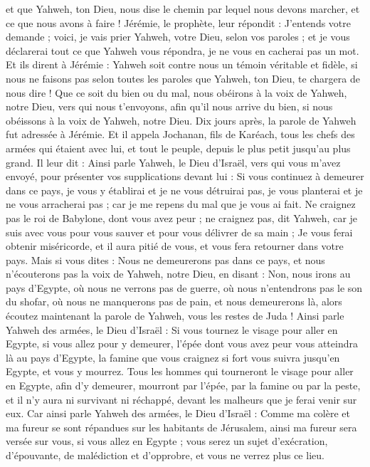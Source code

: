 \begin{multicols}{2}
et que Yahweh, ton Dieu, nous dise le chemin par lequel nous devons marcher, et ce que nous avons à faire !
Jérémie, le prophète, leur répondit : J'entends votre demande ; voici, je vais prier Yahweh, votre Dieu, selon vos paroles ; et je vous déclarerai tout ce que Yahweh vous répondra, je ne vous en cacherai pas un mot.
Et ils dirent à Jérémie : Yahweh soit contre nous un témoin véritable et fidèle, si nous ne faisons pas selon toutes les paroles que Yahweh, ton Dieu, te chargera de nous dire !
Que ce soit du bien ou du mal, nous obéirons à la voix de Yahweh, notre Dieu, vers qui nous t'envoyons, afin qu'il nous arrive du bien, si nous obéissons à la voix de Yahweh, notre Dieu.
Dix jours après, la parole de Yahweh fut adressée à Jérémie.
Et il appela Jochanan, fils de Karéach, tous les chefs des armées qui étaient avec lui, et tout le peuple, depuis le plus petit jusqu'au plus grand.
Il leur dit : Ainsi parle Yahweh, le Dieu d'Israël, vers qui vous m'avez envoyé, pour présenter vos supplications devant lui :
Si vous continuez à demeurer dans ce pays, je vous y établirai et je ne vous détruirai pas, je vous planterai et je ne vous arracherai pas ; car je me repens du mal que je vous ai fait.
Ne craignez pas le roi de Babylone, dont vous avez peur ; ne craignez pas, dit Yahweh, car je suis avec vous pour vous sauver et pour vous délivrer de sa main ;
Je vous ferai obtenir miséricorde, et il aura pitié de vous, et vous fera retourner dans votre pays.
Mais si vous dites : Nous ne demeurerons pas dans ce pays, et nous n'écouterons pas la voix de Yahweh, notre Dieu,
en disant : Non, nous irons au pays d'Egypte, où nous ne verrons pas de guerre, où nous n'entendrons pas le son du shofar, où nous ne manquerons pas de pain, et nous demeurerons là,
alors écoutez maintenant la parole de Yahweh, vous les restes de Juda ! Ainsi parle Yahweh des armées, le Dieu d'Israël : Si vous tournez le visage pour aller en Egypte, si vous allez pour y demeurer,
l'épée dont vous avez peur vous atteindra là au pays d'Egypte, la famine que vous craignez si fort vous suivra jusqu'en Egypte, et vous y mourrez.
Tous les hommes qui tourneront le visage pour aller en Egypte, afin d'y demeurer, mourront par l'épée, par la famine ou par la peste, et il n'y aura ni survivant ni réchappé, devant les malheurs que je ferai venir sur eux.
Car ainsi parle Yahweh des armées, le Dieu d'Israël : Comme ma colère et ma fureur se sont répandues sur les habitants de Jérusalem, ainsi ma fureur sera versée sur vous, si vous allez en Egypte ; vous serez un sujet d'exécration, d'épouvante, de malédiction et d'opprobre, et vous ne verrez plus ce lieu.

\end{multicols}

